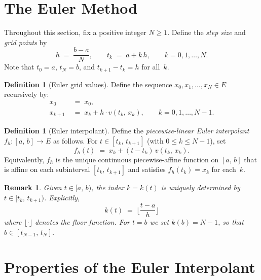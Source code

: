 \documentclass[11pt,a4paper]{article}
\newtheorem{remark}[theorem]{Remark}
\theoremstyle{definition}
\newtheorem{definition}[theorem]{Definition}
\newcommand{\Icc}[2]{[#1,\, #2]}
\newcommand{\Ico}[2]{[#1,\, #2)}
\begin{document}
\section{The Euler Method}\label{sec:euler-def}

Throughout this section, fix a positive integer $N \ge 1$.
Define the \emph{step size} and \emph{grid points} by
\[
  h \;=\; \frac{b - a}{N}, \qquad
  t_k \;=\; a + k\,h, \qquad k = 0, 1, \ldots, N.
\]
Note that $t_0 = a$, $t_N = b$, and $t_{k+1} - t_k = h$ for all~$k$.

\begin{definition}[Euler grid values]\label{def:euler-grid}
Define the sequence $x_0, x_1, \ldots, x_N \in E$ recursively by:
\begin{align}
  x_0 &\;=\; x_0, \label{eq:euler-init}\\
  x_{k+1} &\;=\; x_k + h \cdot v(t_k,\, x_k), \qquad k = 0, 1, \ldots, N-1.
  \label{eq:euler-step}
\end{align}
\end{definition}

\begin{definition}[Euler interpolant]\label{def:euler-interp}
Define the \emph{piecewise-linear Euler interpolant}
$f_h \colon \Icc{a}{b} \to E$ as follows. For $t \in \Icc{t_k}{t_{k+1}}$
(with $0 \le k \le N-1$), set
\begin{equation}\label{eq:interp-def}
  f_h(t) \;=\; x_k + (t - t_k)\,v(t_k,\, x_k).
\end{equation}
Equivalently, $f_h$ is the unique continuous piecewise-affine
function on $\Icc{a}{b}$ that is affine on each subinterval
$\Icc{t_k}{t_{k+1}}$ and satisfies $f_h(t_k) = x_k$ for each~$k$.
\end{definition}

\begin{remark}\label{rem:index-function}
Given $t \in \Ico{a}{b}$, the index $k = k(t)$ is uniquely
determined by $t \in \Ico{t_k}{t_{k+1}}$.
Explicitly,
\[
  k(t) \;=\; \Big\lfloor \frac{t - a}{h} \Big\rfloor
\]
where $\lfloor \cdot \rfloor$ denotes the floor function.
For $t = b$ we set $k(b) = N - 1$, so that $b \in \Icc{t_{N-1}}{t_N}$.
\end{remark}


\section{Properties of the Euler Interpolant}\label{sec:interp-props}
\end{document}
